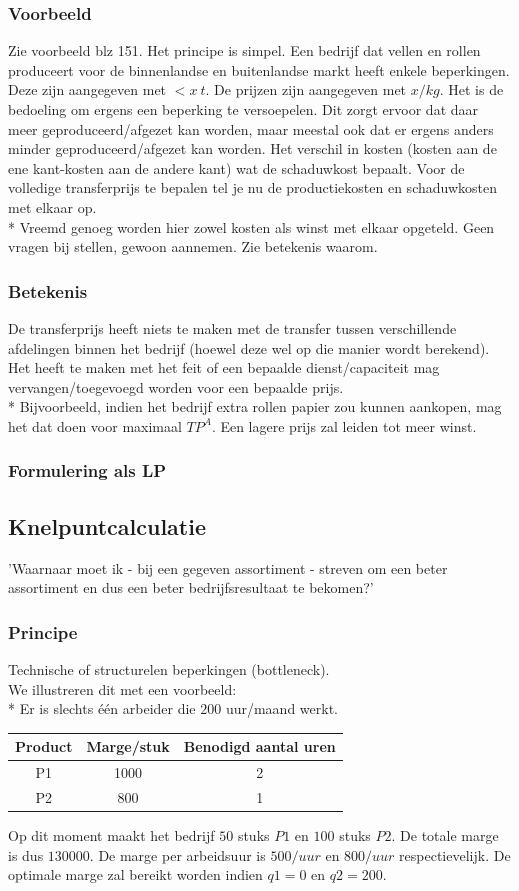 \documentclass[12pt]{article}
\begin{document}
\subsubsection{Voorbeeld}
Zie voorbeeld blz 151. Het principe is simpel. Een bedrijf dat vellen en rollen produceert voor de binnenlandse en buitenlandse markt heeft enkele beperkingen. Deze zijn aangegeven met $< x\ t$. De prijzen zijn aangegeven met $x/kg$. Het is de bedoeling om ergens een beperking te versoepelen. Dit zorgt ervoor dat daar meer geproduceerd/afgezet kan worden, maar meestal ook dat er ergens anders minder geproduceerd/afgezet kan worden. Het verschil in kosten (kosten aan de ene kant-kosten aan de andere kant) wat de schaduwkost bepaalt. Voor de volledige transferprijs te bepalen tel je nu de productiekosten en schaduwkosten met elkaar op.\\*
Vreemd genoeg worden hier zowel kosten als winst met elkaar opgeteld. Geen vragen bij stellen, gewoon aannemen. Zie betekenis waarom.
\subsubsection{Betekenis}
De transferprijs heeft niets te maken met de transfer tussen verschillende afdelingen binnen het bedrijf (hoewel deze wel op die manier wordt berekend). Het heeft te maken met het feit of een bepaalde dienst/capaciteit mag vervangen/toegevoegd worden voor een bepaalde prijs.\\*
Bijvoorbeeld, indien het bedrijf extra rollen papier zou kunnen aankopen, mag het dat doen voor maximaal $TP^A$. Een lagere prijs zal leiden tot meer winst.
\subsubsection{Formulering als LP}
\subsection{Knelpuntcalculatie}
'Waarnaar moet ik - bij een gegeven assortiment - streven om een beter assortiment en dus een beter bedrijfsresultaat te bekomen?'
\subsubsection{Principe}
Technische of structurelen beperkingen (bottleneck).\\
We illustreren dit met een voorbeeld:\\*
Er is slechts \'e\'en arbeider die $200$ uur/maand werkt.
\begin{center}
\begin{tabular}{|c|c|c|}
	\hline
	Product & Marge/stuk & Benodigd aantal uren\\\hline
	P1 & 1000 & 2\\\hline
	P2 & 800 & 1\\\hline
\end{tabular}
\end{center}
Op dit moment maakt het bedrijf $50$ stuks $P1$ en $100$ stuks $P2$. De totale marge is dus $130000$. De marge per arbeidsuur is $500/uur$ en $800/uur$ respectievelijk. De optimale marge zal bereikt worden indien $q1 = 0$ en $q2 = 200$.
\end{document}
